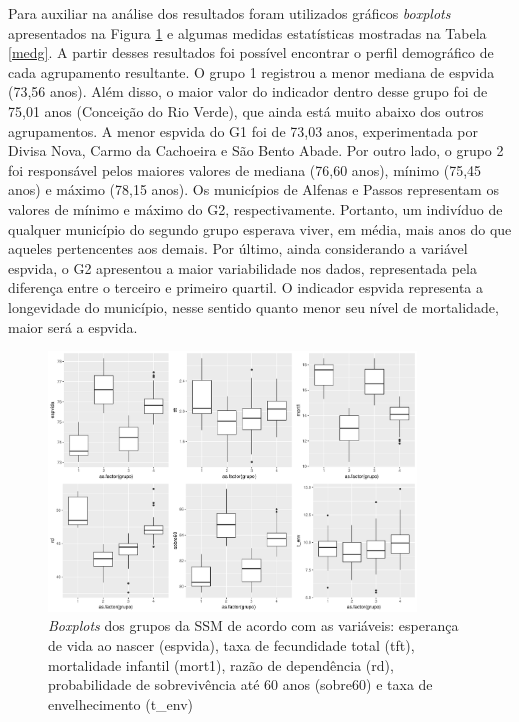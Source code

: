 \documentclass[10pt,twoside]{article}
\begin{document}
Para auxiliar na análise dos resultados foram utilizados gráficos \textit{boxplots} apresentados na Figura \ref{box} e algumas medidas estatísticas mostradas na Tabela \ref{medg}. A partir desses resultados foi possível encontrar o perfil demográfico de cada agrupamento resultante. O grupo 1 registrou a menor mediana de espvida (73,56 anos). Além disso, o maior valor do indicador dentro desse grupo foi de 75,01 anos (Conceição do Rio Verde), que ainda está muito abaixo dos outros agrupamentos. A menor espvida do G1 foi de 73,03 anos, experimentada por Divisa Nova, Carmo da Cachoeira e São Bento Abade. Por outro lado, o grupo 2 foi responsável pelos maiores valores de mediana (76,60 anos),  mínimo (75,45 anos) e máximo (78,15 anos). Os municípios de Alfenas e Passos representam os valores de mínimo e máximo do G2, respectivamente. Portanto, um indivíduo de qualquer município do segundo grupo esperava viver, em média, mais anos do que aqueles pertencentes aos demais. Por último, ainda considerando a variável espvida, o G2 apresentou a maior variabilidade nos dados, representada pela diferença entre o terceiro e primeiro quartil. O indicador espvida representa a longevidade do município, nesse sentido quanto menor seu nível de mortalidade, maior será a espvida.

\begin{figure}[htp!]
\begin{center}
\includegraphics[width=9.75cm]{boxplots1}
\end{center}
\caption{\textit{Boxplots} dos grupos da SSM de acordo com as variáveis: esperança de vida ao nascer (espvida), taxa de fecundidade total (tft), mortalidade infantil (mort1), razão de dependência (rd), probabilidade de sobrevivência até 60 anos (sobre60) e taxa de envelhecimento (t\_env)} \label{box}
\end{figure}
\FloatBarrier
\end{document}
